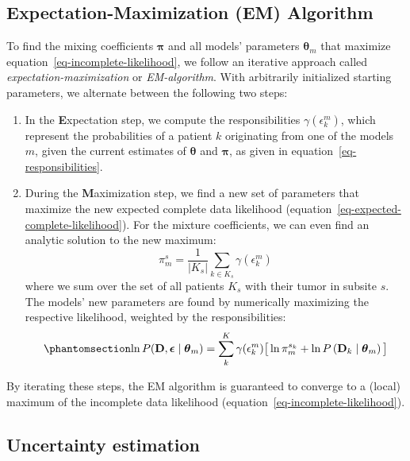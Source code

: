 \documentclass[
  sn-mathphys-num,
]{sn-jnl}
\providecommand{\tightlist}{%
  \setlength{\itemsep}{0pt}\setlength{\parskip}{0pt}}\usepackage{longtable,booktabs,array}
\begin{document}
\subsection{Expectation-Maximization (EM)
Algorithm}\label{expectation-maximization-em-algorithm}

To find the mixing coefficients \(\boldsymbol{\pi}\) and all models'
parameters \(\boldsymbol{\theta}_m\) that maximize
equation~\ref{eq-incomplete-likelihood}, we follow an iterative approach
called \emph{expectation-maximization} or \emph{EM-algorithm}. With
arbitrarily initialized starting parameters, we alternate between the
following two steps:

\begin{enumerate}
\def\labelenumi{\arabic{enumi}.}
\tightlist
\item
  In the \textbf{E}xpectation step, we compute the responsibilities
  \(\gamma(\epsilon_k^m)\), which represent the probabilities of a
  patient \(k\) originating from one of the models \(m\), given the
  current estimates of \(\boldsymbol{\theta}\) and \(\boldsymbol{\pi}\),
  as given in equation~\ref{eq-responsibilities}.
\item
  During the \textbf{M}aximization step, we find a new set of parameters
  that maximize the new expected complete data likelihood
  (equation~\ref{eq-expected-complete-likelihood}). For the mixture
  coefficients, we can even find an analytic solution to the new
  maximum: \[
  \pi_m^s = \frac{1}{|K_s|} \sum_{k \in K_s} \gamma(\epsilon_k^m)
  \] where we sum over the set of all patients \(K_s\) with their tumor
  in subsite \(s\).\\
  The models' new parameters are found by numerically maximizing the
  respective likelihood, weighted by the responsibilities:
  \begin{equation}\phantomsection\label{eq-maximization-step}{
  \ln P(\mathbf{D}, \boldsymbol{\epsilon} \mid \boldsymbol{\theta}_m) = \sum_k^K \gamma(\epsilon^m_{k}) \big[ \ln \pi_m^{s_k} + \ln P \left( \mathbf{D}_k \mid \boldsymbol{\theta}_m \right) \big]
  }\end{equation}
\end{enumerate}

By iterating these steps, the EM algorithm is guaranteed to converge to
a (local) maximum of the incomplete data likelihood
(equation~\ref{eq-incomplete-likelihood}).

\subsection{Uncertainty estimation}\label{sec-uncert}
\end{document}
